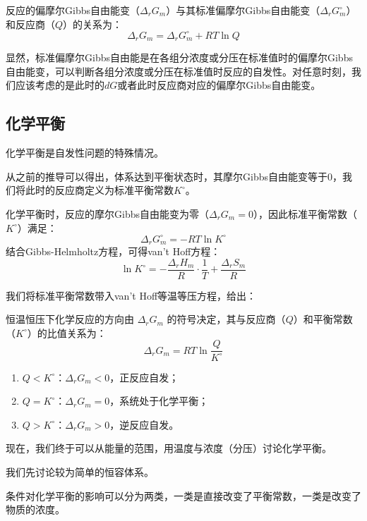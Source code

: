 \begin{proposition}
反应的偏摩尔Gibbs自由能变（$\Delta_r G_m$）与其标准偏摩尔Gibbs自由能变（$\Delta_r G_m^\circ$）和反应商（$Q$）的关系为：
$$\Delta_r G_m = \Delta_r G_m^\circ + RT\ln Q$$
\end{proposition}

显然，标准偏摩尔Gibbs自由能是在各组分浓度或分压在标准值时的偏摩尔Gibbs自由能变，可以判断各组分浓度或分压在标准值时反应的自发性。对任意时刻，我们应该考虑的是此时的$dG$或者此时反应商对应的偏摩尔Gibbs自由能变。

\subsection{化学平衡}

化学平衡是自发性问题的特殊情况。



从之前的推导可以得出，体系达到平衡状态时，其摩尔Gibbs自由能变等于0，我们将此时的反应商定义为标准平衡常数$K^\circ$。

\begin{proposition}[标准平衡常数]
化学平衡时，反应的摩尔Gibbs自由能变为零（$\Delta_r G_m=0$），因此标准平衡常数（$K^\circ$）满足：
$$\Delta_r G_m^\circ = -RT\ln K^\circ$$
结合Gibbs-Helmholtz方程，可得van't Hoff方程：
$$\ln K^\circ = -\frac{\Delta_r H_m}{R} \cdot \frac{1}{T} + \frac{\Delta_r S_m}{R}$$
\end{proposition}

我们将标准平衡常数带入van't Hoff等温等压方程，给出：

\begin{proposition}[反应方向判断]
恒温恒压下化学反应的方向由 $\Delta_r G_m$ 的符号决定，其与反应商（$Q$）和平衡常数（$K^\circ$）的比值关系为：
$$\Delta_r G_m = RT\ln\frac{Q}{K^\circ}$$
\begin{enumerate}
    \item $Q < K^\circ$：$\Delta_r G_m < 0$，正反应自发；
    \item $Q = K^\circ$：$\Delta_r G_m = 0$，系统处于化学平衡；
    \item $Q > K^\circ$：$\Delta_r G_m > 0$，逆反应自发。
    \end{enumerate}
\end{proposition}

现在，我们终于可以从能量的范围，用温度与浓度（分压）讨论化学平衡。

我们先讨论较为简单的恒容体系。

条件对化学平衡的影响可以分为两类，一类是直接改变了平衡常数，一类是改变了物质的浓度。

